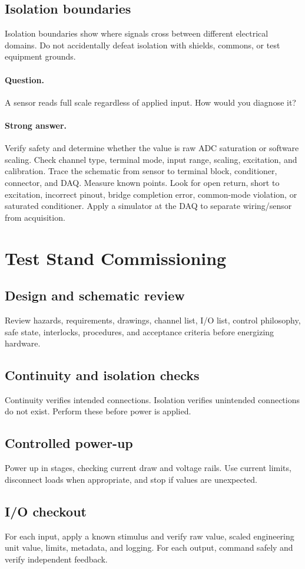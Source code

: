 \documentclass[11pt]{article}
\newcommand{\question}[1]{\paragraph{Question.} #1}
\newcommand{\stronganswer}[1]{\paragraph{Strong answer.} #1}
\begin{document}
\subsection{Isolation boundaries}
Isolation boundaries show where signals cross between different electrical
domains. Do not accidentally defeat isolation with shields, commons, or test
equipment grounds.

\question{A sensor reads full scale regardless of applied input. How would you diagnose it?}
\stronganswer{Verify safety and determine whether the value is raw ADC
saturation or software scaling. Check channel type, terminal mode, input range,
scaling, excitation, and calibration. Trace the schematic from sensor to terminal
block, conditioner, connector, and DAQ. Measure known points. Look for open
return, short to excitation, incorrect pinout, bridge completion error,
common-mode violation, or saturated conditioner. Apply a simulator at the DAQ to
separate wiring/sensor from acquisition.}

\section{Test Stand Commissioning}

\subsection{Design and schematic review}
Review hazards, requirements, drawings, channel list, I/O list, control
philosophy, safe state, interlocks, procedures, and acceptance criteria before
energizing hardware.

\subsection{Continuity and isolation checks}
Continuity verifies intended connections. Isolation verifies unintended
connections do not exist. Perform these before power is applied.

\subsection{Controlled power-up}
Power up in stages, checking current draw and voltage rails. Use current limits,
disconnect loads when appropriate, and stop if values are unexpected.

\subsection{I/O checkout}
For each input, apply a known stimulus and verify raw value, scaled engineering
unit value, limits, metadata, and logging. For each output, command safely and
verify independent feedback.
\end{document}
